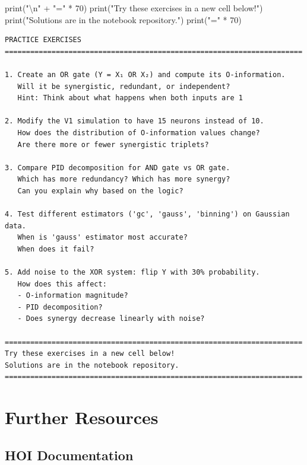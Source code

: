 \documentclass[
  11pt,
  letterpaper,
  oneside,
  openany]{book}
\newenvironment{Shaded}{\begin{snugshade}}{\end{snugshade}}
\newcommand{\BuiltInTok}[1]{\textcolor[rgb]{0.00,0.23,0.31}{#1}}
\newcommand{\CharTok}[1]{\textcolor[rgb]{0.13,0.47,0.30}{#1}}
\newcommand{\DecValTok}[1]{\textcolor[rgb]{0.68,0.00,0.00}{#1}}
\newcommand{\NormalTok}[1]{\textcolor[rgb]{0.00,0.23,0.31}{#1}}
\newcommand{\OperatorTok}[1]{\textcolor[rgb]{0.37,0.37,0.37}{#1}}
\newcommand{\StringTok}[1]{\textcolor[rgb]{0.13,0.47,0.30}{#1}}
\begin{document}
\begin{Shaded}
\begin{Highlighting}[]
\BuiltInTok{print}\NormalTok{(}\StringTok{"}\CharTok{\textbackslash{}n}\StringTok{"} \OperatorTok{+} \StringTok{"="} \OperatorTok{*} \DecValTok{70}\NormalTok{)}
\BuiltInTok{print}\NormalTok{(}\StringTok{"Try these exercises in a new cell below!"}\NormalTok{)}
\BuiltInTok{print}\NormalTok{(}\StringTok{"Solutions are in the notebook repository."}\NormalTok{)}
\BuiltInTok{print}\NormalTok{(}\StringTok{"="} \OperatorTok{*} \DecValTok{70}\NormalTok{)}
\end{Highlighting}
\end{Shaded}

\begin{verbatim}
PRACTICE EXERCISES
======================================================================

1. Create an OR gate (Y = X₁ OR X₂) and compute its O-information.
   Will it be synergistic, redundant, or independent?
   Hint: Think about what happens when both inputs are 1

2. Modify the V1 simulation to have 15 neurons instead of 10.
   How does the distribution of O-information values change?
   Are there more or fewer synergistic triplets?

3. Compare PID decomposition for AND gate vs OR gate.
   Which has more redundancy? Which has more synergy?
   Can you explain why based on the logic?

4. Test different estimators ('gc', 'gauss', 'binning') on Gaussian data.
   When is 'gauss' estimator most accurate?
   When does it fail?

5. Add noise to the XOR system: flip Y with 30% probability.
   How does this affect:
   - O-information magnitude?
   - PID decomposition?
   - Does synergy decrease linearly with noise?

======================================================================
Try these exercises in a new cell below!
Solutions are in the notebook repository.
======================================================================
\end{verbatim}

\section{Further Resources}\label{further-resources}

\subsection{HOI Documentation}\label{hoi-documentation}
\end{document}
